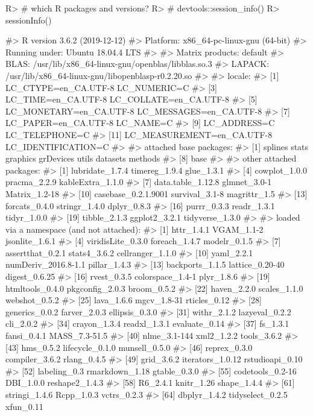 \documentclass[
]{jss}
\begin{document}
\begin{CodeChunk}

\begin{CodeInput}
R> # which R packages and versions?
R> # devtools::session_info()
R> sessionInfo()
\end{CodeInput}

\begin{CodeOutput}
#> R version 3.6.2 (2019-12-12)
#> Platform: x86_64-pc-linux-gnu (64-bit)
#> Running under: Ubuntu 18.04.4 LTS
#> 
#> Matrix products: default
#> BLAS:   /usr/lib/x86_64-linux-gnu/openblas/libblas.so.3
#> LAPACK: /usr/lib/x86_64-linux-gnu/libopenblasp-r0.2.20.so
#> 
#> locale:
#>  [1] LC_CTYPE=en_CA.UTF-8       LC_NUMERIC=C              
#>  [3] LC_TIME=en_CA.UTF-8        LC_COLLATE=en_CA.UTF-8    
#>  [5] LC_MONETARY=en_CA.UTF-8    LC_MESSAGES=en_CA.UTF-8   
#>  [7] LC_PAPER=en_CA.UTF-8       LC_NAME=C                 
#>  [9] LC_ADDRESS=C               LC_TELEPHONE=C            
#> [11] LC_MEASUREMENT=en_CA.UTF-8 LC_IDENTIFICATION=C       
#> 
#> attached base packages:
#> [1] splines   stats     graphics  grDevices utils     datasets  methods  
#> [8] base     
#> 
#> other attached packages:
#>  [1] lubridate_1.7.4     timereg_1.9.4       glue_1.3.1         
#>  [4] cowplot_1.0.0       pracma_2.2.9        kableExtra_1.1.0   
#>  [7] data.table_1.12.8   glmnet_3.0-1        Matrix_1.2-18      
#> [10] casebase_0.2.1.9001 survival_3.1-8      magrittr_1.5       
#> [13] forcats_0.4.0       stringr_1.4.0       dplyr_0.8.3        
#> [16] purrr_0.3.3         readr_1.3.1         tidyr_1.0.0        
#> [19] tibble_2.1.3        ggplot2_3.2.1       tidyverse_1.3.0    
#> 
#> loaded via a namespace (and not attached):
#>  [1] httr_1.4.1          VGAM_1.1-2          jsonlite_1.6.1     
#>  [4] viridisLite_0.3.0   foreach_1.4.7       modelr_0.1.5       
#>  [7] assertthat_0.2.1    stats4_3.6.2        cellranger_1.1.0   
#> [10] yaml_2.2.1          numDeriv_2016.8-1.1 pillar_1.4.3       
#> [13] backports_1.1.5     lattice_0.20-40     digest_0.6.25      
#> [16] rvest_0.3.5         colorspace_1.4-1    plyr_1.8.6         
#> [19] htmltools_0.4.0     pkgconfig_2.0.3     broom_0.5.2        
#> [22] haven_2.2.0         scales_1.1.0        webshot_0.5.2      
#> [25] lava_1.6.6          mgcv_1.8-31         rticles_0.12       
#> [28] generics_0.0.2      farver_2.0.3        ellipsis_0.3.0     
#> [31] withr_2.1.2         lazyeval_0.2.2      cli_2.0.2          
#> [34] crayon_1.3.4        readxl_1.3.1        evaluate_0.14      
#> [37] fs_1.3.1            fansi_0.4.1         MASS_7.3-51.5      
#> [40] nlme_3.1-144        xml2_1.2.2          tools_3.6.2        
#> [43] hms_0.5.2           lifecycle_0.1.0     munsell_0.5.0      
#> [46] reprex_0.3.0        compiler_3.6.2      rlang_0.4.5        
#> [49] grid_3.6.2          iterators_1.0.12    rstudioapi_0.10    
#> [52] labeling_0.3        rmarkdown_1.18      gtable_0.3.0       
#> [55] codetools_0.2-16    DBI_1.0.0           reshape2_1.4.3     
#> [58] R6_2.4.1            knitr_1.26          shape_1.4.4        
#> [61] stringi_1.4.6       Rcpp_1.0.3          vctrs_0.2.3        
#> [64] dbplyr_1.4.2        tidyselect_0.2.5    xfun_0.11
\end{CodeOutput}
\end{CodeChunk}
\end{document}
